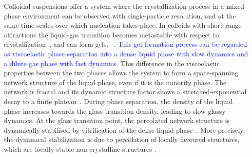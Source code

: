 \documentclass[preprint,amsmath,amssymb,superscriptaddress]{revtex4-1}
\begin{document}
Colloidal suspensions offer a system where the crystallization process in a mixed-phase environment can be observed with single-particle
resolution, and at the same time scales over which nucleation takes place. In colloids with short-range attractions the liquid-gas transition 
becomes metastable with respect to crystallization~\cite{anderson2002insights,lekkerkerker2011colloids}, and can form gels.  
~\cite{poon2002,zaccarelli2007,piazza1994phase,verhaegh1997transient,lu2008gelation}. 
\textcolor{blue}{This gel formation process can be regarded as viscoelastic phase separation  \cite{tanaka1999colloid,tanaka2000viscoelastic} into a dense liquid phase with slow dynamics and a dilute gas phase with fast dynamics.} 
This difference in the viscoelastic properties between the two phases allows the system to form a space-spanning 
network structure of the liquid phase, even if it is the minority phase. The network is fractal and its dynamic structure factor shows a stretched-exponential decay to a finite
plateau~\cite{krall1998internal,solomon2001dynamic,romer2000sol}. 
During phase separation, the density of the liquid phase increases towards the glass-transition density, leading to slow glassy dynamics.
At the glass transition point, the percolated network structure is dynamically stabilised by vitrification 
of the dense liquid phase~\cite{pusey1993dynamics,piazza1994phase,ilett1995phase,verhaegh1997transient,tanaka1999colloid,foffi2002,buzzaccaro2007sticky,zaccarelli2007,lu2008gelation,zaccarelli2008gelation,testard2011}.  
More precisely, the dynamical stabilization is due to percolation of locally favoured structures, which are locally stable non-crystalline structures \cite{royall2008g}.
\end{document}
